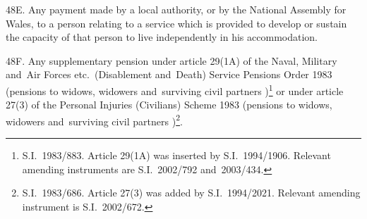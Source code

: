 \documentclass[12pt,a4paper]{article}
\begin{document}
%
%

48E.  Any payment made by a local authority, or by the National Assembly for Wales, to a person relating to a service which is provided to develop or sustain the capacity of that person to live independently in his accommodation.


\medskip

48F.  Any supplementary pension under article 29(1A) of the Naval, Military and~Air Forces etc.\ (Disablement and~Death) Service Pensions Order 1983 (pensions to 
widows, widowers and~surviving civil partners%
)\footnote{S.I.\ 1983/883. Article 29(1A) was inserted by S.I.\ 1994/1906. Relevant amending instruments are S.I.\ 2002/792 and~2003/434.} or under article 27(3) of the Personal Injuries (Civilians) Scheme 1983 (pensions to 
widows, widowers and~surviving civil partners%
)\footnote{S.I.\ 1983/686. Article 27(3) was added by S.I.\ 1994/2021. Relevant amending instrument is S.I.\ 2002/672.}.

\end{document}

